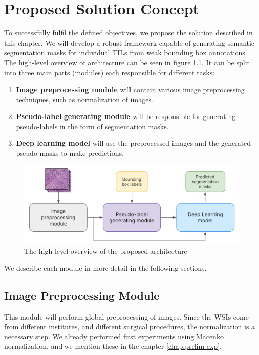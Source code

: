 \chapter{Proposed Solution Concept}
\label{chap:solution-concept}

To successfully fulfil the defined objectives, we propose the solution described in this chapter. We will develop a robust framework capable of generating semantic segmentation masks for individual TILs from weak bounding box annotations. The high-level overview of architecture can be seen in figure \ref{fig:sc-main}. It can be split into three main parts (modules) each responsible for different tasks:

\begin{enumerate}
    \item \textbf{Image preprocessing module} will contain various image preprocessing techniques, such as normalization of images.
    \item \textbf{Pseudo-label generating module} will be responsible for generating pseudo-labels in the form of segmentation masks.
    \item \textbf{Deep learning model} will use the preprocessed images and the generated pseudo-masks to make predictions.
\end{enumerate}

\begin{figure}[H]
    \begin{centering}
    \includegraphics[width=14cm]{assets/images/sc-main.png}
    \par\end{centering}
    \caption{The high-level overview of the proposed architecture}
    \label{fig:sc-main}
\end{figure}

We describe each module in more detail in the following sections.

\section{Image Preprocessing Module}
This module will perform global preprocessing of images. Since the WSIs come from different institutes, and different surgical procedures, the normalization is a necessary step. We already performed first experiments using Macenko normalization, and we mention these in the chapter \ref{chap:prelim-exp}.


